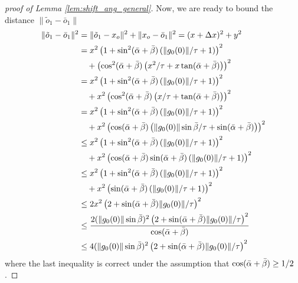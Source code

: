 \documentclass[12pt]{article}
\theoremstyle{remark}
\begin{document}
\begin{appendices}
\begin{proof}[proof of Lemma \ref{lem:shift_ang_general}]
Now, we are ready to bound the distance $\|\tilde{o}_1 - \bar{o}_1\|$
\begin{equation}\label{eq:baro-tilde0_2}
\begin{aligned}
\|\tilde{o}_1 - \bar{o}_1\|^2 &= \|\tilde{o}_1 - x_o\|^2 + \|x_o - \bar{o}_1\|^2 = (x+\Delta x)^2 + y^2
\\&=
x^2 \left(1+\sin^2(\bar{\alpha}+\bar{\beta})\left( \|g_0(0)\|/\tau + 1\right) \right)^2
\\&~~~+
\left(\cos^2(\bar{\alpha}+\bar{\beta}) \left( x^2/\tau +  x \tan (\bar{\alpha}+\bar{\beta})\right)\right)^2
\\&=
x^2 \left(1+\sin^2(\bar{\alpha}+\bar{\beta})\left( \|g_0(0)\|/\tau + 1\right) \right)^2
\\&~~~+
x^2\left(\cos^2(\bar{\alpha}+\bar{\beta}) \left( x/\tau +  \tan (\bar{\alpha}+\bar{\beta})\right)\right)^2
\\&=
x^2 \left(1+\sin^2(\bar{\alpha}+\bar{\beta})\left( \|g_0(0)\|/\tau + 1\right) \right)^2
\\&~~~+
x^2\left(\cos(\bar{\alpha}+\bar{\beta}) \left( \|g_0(0)\|\sin\bar{\beta} /\tau +  \sin (\bar{\alpha}+\bar{\beta})\right)\right)^2
\\&\leq
x^2 \left(1+\sin^2(\bar{\alpha}+\bar{\beta})\left( \|g_0(0)\|/\tau + 1\right) \right)^2
\\&~~~+
x^2\left(\cos(\bar{\alpha}+\bar{\beta}) \sin (\bar{\alpha}+\bar{\beta})\left( \|g_0(0)\|/\tau+ 1 \right)\right)^2
\\&\leq
x^2 \left(1+\sin^2(\bar{\alpha}+\bar{\beta})\left( \|g_0(0)\|/\tau + 1\right) \right)^2
\\&~~~+
x^2\left(\sin (\bar{\alpha}+\bar{\beta})\left( \|g_0(0)\|/\tau+ 1 \right)\right)^2
\\&\leq
2x^2 \left(2+\sin(\bar{\alpha}+\bar{\beta})\|g_0(0)\| /\tau\right)^2
\\&\leq
\frac{2(\|g_0(0)\|\sin{\bar{\beta}})^2 \left(2+\sin(\bar{\alpha}+\bar{\beta})\|g_0(0)\|/\tau \right)^2}{\cos(\bar{\alpha}+\bar{\beta})}
\\&\leq
4(\|g_0(0)\|\sin{\bar{\beta}})^2 \left(2+\sin(\bar{\alpha}+\bar{\beta}) \|g_0(0)\|/\tau  \right)^2
\end{aligned}
\end{equation}
where the last inequality is correct under the assumption that $\cos(\bar{\alpha}+\bar{\beta})\geq 1/2$.




\end{proof}
\end{appendices}
\end{document}
